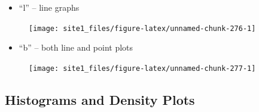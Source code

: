 \documentclass[]{book}
\newenvironment{Shaded}{\begin{snugshade}}{\end{snugshade}}
\newcommand{\KeywordTok}[1]{\textcolor[rgb]{0.13,0.29,0.53}{\textbf{#1}}}
\newcommand{\DataTypeTok}[1]{\textcolor[rgb]{0.13,0.29,0.53}{#1}}
\newcommand{\StringTok}[1]{\textcolor[rgb]{0.31,0.60,0.02}{#1}}
\newcommand{\CommentTok}[1]{\textcolor[rgb]{0.56,0.35,0.01}{\textit{#1}}}
\newcommand{\OperatorTok}[1]{\textcolor[rgb]{0.81,0.36,0.00}{\textbf{#1}}}
\newcommand{\NormalTok}[1]{#1}
\providecommand{\tightlist}{%
  \setlength{\itemsep}{0pt}\setlength{\parskip}{0pt}}
\begin{document}
\begin{itemize}
\tightlist
\item
  ``l'' -- line graphs
\end{itemize}

\begin{Shaded}
\end{Shaded}

\begin{figure}

{\centering \texttt{[image: site1\_files/figure-latex/unnamed-chunk-276-1]} 

}

\caption{ }\label{fig:unnamed-chunk-276}
\end{figure}

\begin{itemize}
\tightlist
\item
  ``b'' -- both line and point plots
\end{itemize}

\begin{Shaded}
\end{Shaded}

\begin{figure}

{\centering \texttt{[image: site1\_files/figure-latex/unnamed-chunk-277-1]} 

}

\caption{ }\label{fig:unnamed-chunk-277}
\end{figure}

\subsection{Histograms and Density
Plots}\label{histograms-and-density-plots}
\end{document}
